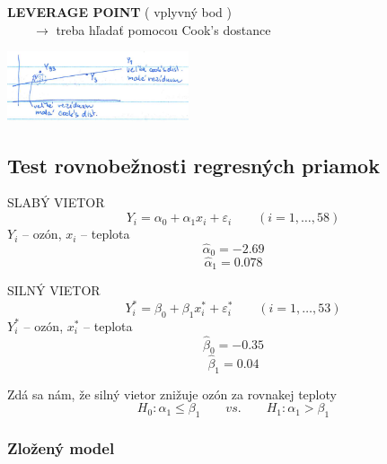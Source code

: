 \documentclass[unknownkeysallowed]{article}
\begin{document}
\begin{multicols}{2}

\textbf{LEVERAGE POINT} ( vplyvný bod )\\
$\qquad \to$ treba hľadať pomocou Cook's dostance

\columnbreak

\includegraphics[width=0.4\textwidth]{imgs/obr39.png}

\end{multicols}


\subsection*{Test rovnobežnosti regresných priamok}

\begin{multicols}{2}

\begin{center}
SLABÝ VIETOR
$$Y_i = \alpha_0 + \alpha_1x_i + \varepsilon_i \qquad (i=1,\ldots,58)$$
$Y_i$ -- ozón, $x_i$ -- teplota
$$\hat{\alpha}_0 = -2.69$$
$$\hat{\alpha}_1 = 0.078$$
\end{center}

\columnbreak

\begin{center}
SILNÝ VIETOR
$$Y^*_i = \beta_0 + \beta_1x^*_i + \varepsilon^*_i \qquad (i=1,\ldots,53)$$
$Y^*_i$ -- ozón, $x^*_i$ -- teplota
$$\hat{\beta}_0 = -0.35$$
$$\hat{\beta}_1 = 0.04$$
\end{center}

\end{multicols}

Zdá sa nám, že silný vietor znižuje ozón za rovnakej teploty
$$H_0: \alpha_1 \leq \beta_1 \qquad vs. \qquad H_1: \alpha_1 > \beta_1$$

\subsubsection*{Zložený model}
\end{document}
